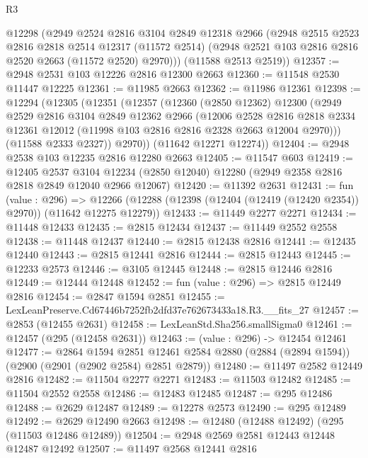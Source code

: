 \begin{lexlean}{R3}
\begin{coremodule}
      @12298
      (@2949
        @2524
        @2816
        @3104
        @2849
        @12318
        @2966
        (@2948
          @2515
          @2523
          @2816
          @2818
          @2514
          @12317
          (@11572 @2514)
          (@2948 @2521 @103 @2816 @2816 @2520 @2663 (@11572 @2520) @2970)))
      (@11588 @2513 @2519))
@12357 := @2948 @2531 @103 @12226 @2816 @12300 @2663
@12360 := @11548 @2530 @11447 @12225
@12361 := @11985 @2663
@12362 := @11986 @12361
@12398 := @12294
    (@12305
      (@12351
        (@12357
          (@12360
            (@2850 @12362)
            @12300
            (@2949
              @2529
              @2816
              @3104
              @2849
              @12362
              @2966
              (@12006
                @2528
                @2816
                @2818
                @2334
                @12361
                @12012
                (@11998 @103 @2816 @2816 @2328 @2663 @12004 @2970)))
            (@11588 @2333 @2327))
          @2970))
      (@11642 @12271 @12274))
@12404 := @2948 @2538 @103 @12235 @2816 @12280 @2663
@12405 := @11547 @603
@12419 := @12405
    @2537
    @3104
    @12234
    (@2850 @12040)
    @12280
    (@2949 @2358 @2816 @2818 @2849 @12040 @2966 @12067)
@12420 := @11392 @2631
@12431 := fun (value : @296) =>
  @12266 (@12288 (@12398 (@12404 (@12419 (@12420 @2354)) @2970)) (@11642 @12275 @12279))
@12433 := @11449 @2277 @2271
@12434 := @11448 @12433
@12435 := @2815 @12434
@12437 := @11449 @2552 @2558
@12438 := @11448 @12437
@12440 := @2815 @12438 @2816
@12441 := @12435 @12440
@12443 := @2815 @12441 @2816
@12444 := @2815 @12443
@12445 := @12233 @2573
@12446 := @3105 @12445
@12448 := @2815 @12446 @2816
@12449 := @12444 @12448
@12452 := fun (value : @296) => @2815 @12449 @2816
@12454 := @2847 @1594 @2851
@12455 := LexLeanPreserve.Cd67446b7252fb2dfd37e762673433a18.R3.__fits_27
@12457 := @2853 (@12455 @2631)
@12458 := LexLeanStd.Sha256.smallSigma0
@12461 := @12457 (@295 (@12458 @2631))
@12463 := (value : @296) -> @12454 @12461
@12477 := @2864
    @1594
    @2851
    @12461
    @2584
    @2880
    (@2884 (@2894 @1594))
    (@2900 (@2901 (@2902 @2584) @2851 @2879))
@12480 := @11497 @2582 @12449 @2816
@12482 := @11504 @2277 @2271
@12483 := @11503 @12482
@12485 := @11504 @2552 @2558
@12486 := @12483 @12485
@12487 := @295 @12486
@12488 := @2629 @12487
@12489 := @12278 @2573
@12490 := @295 @12489
@12492 := @2629 @12490 @2663
@12498 := @12480 (@12488 @12492) (@295 (@11503 @12486 @12489))
@12504 := @2948 @2569 @2581 @12443 @12448 @12487 @12492
@12507 := @11497 @2568 @12441 @2816

\end{coremodule}
\end{lexlean}
